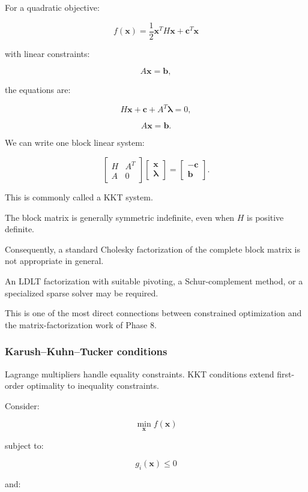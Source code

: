 For a quadratic objective:

\[
f(\mathbf x)=\frac12\mathbf x^TH\mathbf x+\mathbf c^T\mathbf x
\]

with linear constraints:

\[
A\mathbf x=\mathbf b,
\]

the equations are:

\[
H\mathbf x+\mathbf c+A^T\boldsymbol\lambda=0,
\]

\[
A\mathbf x=\mathbf b.
\]

We can write one block linear system:

\[
\boxed{ \begin{bmatrix} H&A^T\\ A&0 \end{bmatrix} \begin{bmatrix} \mathbf x\\ \boldsymbol\lambda \end{bmatrix} = \begin{bmatrix} -\mathbf c\\ \mathbf b \end{bmatrix} }.
\]

This is commonly called a KKT system.

The block matrix is generally symmetric indefinite, even when \(H\) is positive definite.

Consequently, a standard Cholesky factorization of the complete block matrix is not appropriate in general.

An LDLT factorization with suitable pivoting, a Schur-complement method, or a specialized sparse solver may be required.

This is one of the most direct connections between constrained optimization and the matrix-factorization work of Phase 8.

\subsubsection{Karush--Kuhn--Tucker conditions}\label{02-foundations-ii-ch026-karushkuhntucker-conditions}

Lagrange multipliers handle equality constraints. KKT conditions extend first-order optimality to inequality constraints.

Consider:

\[
\min_{\mathbf x}f(\mathbf x)
\]

subject to:

\[
g_i(\mathbf x)\le0
\]

and:

